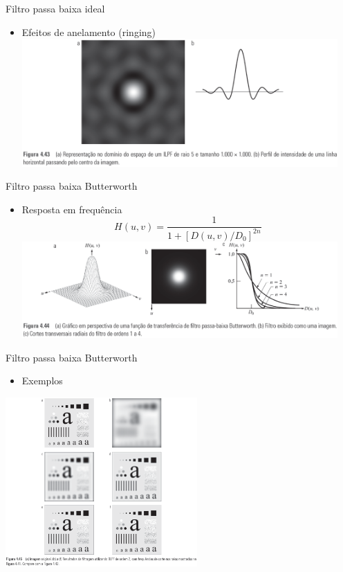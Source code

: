       \begin{slide}[toc=]{Filtro passa baixa ideal}
         \begin{itemize}[type=1]
            \item Efeitos de anelamento (ringing)
            \includegraphics[width=0.95\textwidth]{figs/fig0443}
         \end{itemize}
      \end{slide}
      
      \begin{slide}[toc=]{Filtro passa baixa Butterworth}
         \begin{itemize}[type=1]
            \item Resposta em frequência
            \begin{equation*}
               H(u,v) = \frac{1}{1+\left[ D(u,v)/D_0\right]^{2n}}
            \end{equation*}
            \includegraphics[width=0.95\textwidth]{figs/fig0444}
         \end{itemize}
      \end{slide}
      
      \begin{slide}[toc=]{Filtro passa baixa Butterworth}
         \begin{itemize}[type=1]
            \item Exemplos
         \end{itemize}
	      \begin{center}
            \includegraphics[width=0.55\textwidth]{figs/fig0445}
	      \end{center}
      \end{slide}
      
